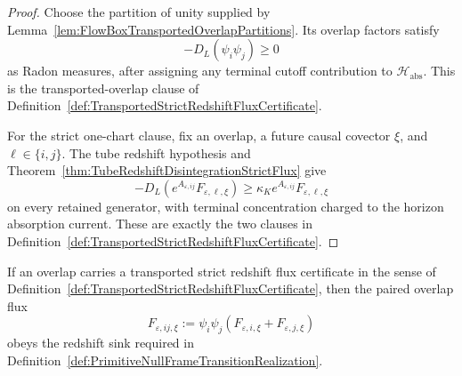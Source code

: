 \begin{proof}
Choose the partition of unity supplied by Lemma~\ref{lem:FlowBoxTransportedOverlapPartitions}.  Its overlap factors satisfy
\[
    -D_L(\psi_i\psi_j)\ge0
\]
as Radon measures, after assigning any terminal cutoff contribution to $\mathcal H_{\mathrm{abs}}$.  This is the transported-overlap clause of Definition~\ref{def:TransportedStrictRedshiftFluxCertificate}.

For the strict one-chart clause, fix an overlap, a future causal covector $\xi$, and $\ell\in\{i,j\}$.  The tube redshift hypothesis and Theorem~\ref{thm:TubeRedshiftDisintegrationStrictFlux} give
\[
    -D_L(e^{A_{\varepsilon,ij}}F_{\varepsilon,\ell,\xi})
    \ge
    \kappa_K e^{A_{\varepsilon,ij}}F_{\varepsilon,\ell,\xi}
\]
on every retained generator, with terminal concentration charged to the horizon absorption current.  These are exactly the two clauses in Definition~\ref{def:TransportedStrictRedshiftFluxCertificate}.
\end{proof}

\begin{theorem}\label{thm:StrictRedshiftFluxGivesPairedSink}
If an overlap carries a transported strict redshift flux certificate in the sense of Definition~\ref{def:TransportedStrictRedshiftFluxCertificate}, then the paired overlap flux
\[
    F_{\varepsilon,ij,\xi}
    :=
    \psi_i\psi_j
    \left(
        F_{\varepsilon,i,\xi}+F_{\varepsilon,j,\xi}
    \right)
\]
obeys the redshift sink required in Definition~\ref{def:PrimitiveNullFrameTransitionRealization}.
\end{theorem}

